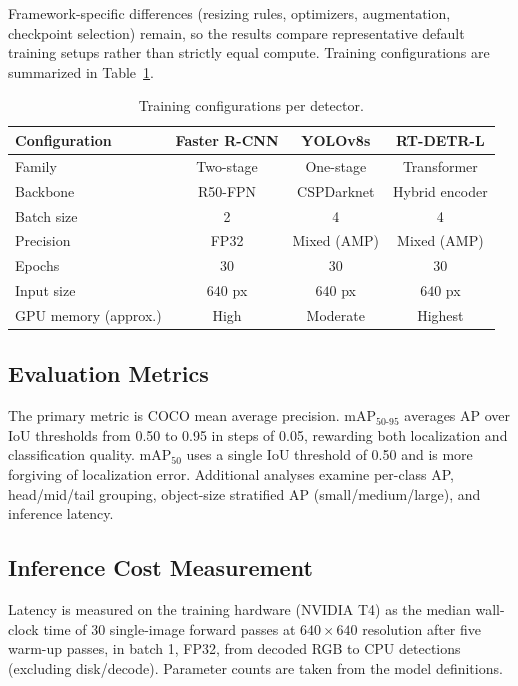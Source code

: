 \documentclass[11pt,a4paper]{article}
\begin{document}
Framework-specific differences (resizing rules, optimizers, augmentation, checkpoint selection) remain, so the results compare representative default training setups rather than strictly equal compute. Training configurations are summarized in Table~\ref{tab:training}.

\begin{table}[H]
\centering
\small
\caption{Training configurations per detector.}
\label{tab:training}
\begin{tabular}{@{}lccc@{}}
\toprule
Configuration & Faster R-CNN & YOLOv8s & RT-DETR-L \\
\midrule
Family & Two-stage & One-stage & Transformer \\
Backbone & R50-FPN & CSPDarknet & Hybrid encoder \\
Batch size & 2 & 4 & 4 \\
Precision & FP32 & Mixed (AMP) & Mixed (AMP) \\
Epochs & 30 & 30 & 30 \\
Input size & $640$ px & $640$ px & $640$ px \\
GPU memory (approx.) & High & Moderate & Highest \\
\bottomrule
\end{tabular}
\end{table}

\subsection{Evaluation Metrics}
The primary metric is COCO mean average precision. mAP$_{50\text{-}95}$ averages AP over IoU thresholds from 0.50 to 0.95 in steps of 0.05, rewarding both localization and classification quality. mAP$_{50}$ uses a single IoU threshold of 0.50 and is more forgiving of localization error. Additional analyses examine per-class AP, head/mid/tail grouping, object-size stratified AP (small/medium/large), and inference latency.

\subsection{Inference Cost Measurement}
Latency is measured on the training hardware (NVIDIA T4) as the median wall-clock time of 30 single-image forward passes at $640\times640$ resolution after five warm-up passes, in batch 1, FP32, from decoded RGB to CPU detections (excluding disk/decode). Parameter counts are taken from the model definitions.

\end{document}
